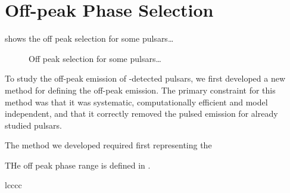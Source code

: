 \section{Off-peak Phase Selection}


 shows the off peak selection for some pulsars\dots

\begin{figure}
  \ifdefined\bwfigures
  \else
  \fi
  \caption{Off peak selection for some pulsars\dots}
  \label{fig:off_peak_select}
\end{figure}


To study the off-peak emission of \lat-detected pulsars, we first
developed a new method for defining the off-peak emission.
The primary constraint for this method was that it was systematic,
computationally efficient and model independent, and that it correctly
removed the pulsed emission for already studied pulsars.

The method we developed required first representing the 

THe off peak phase range is defined in .


\begin{deluxetable}{lcccc}
  \tabletypesize{\scriptsize}
  
\end{deluxetable}

